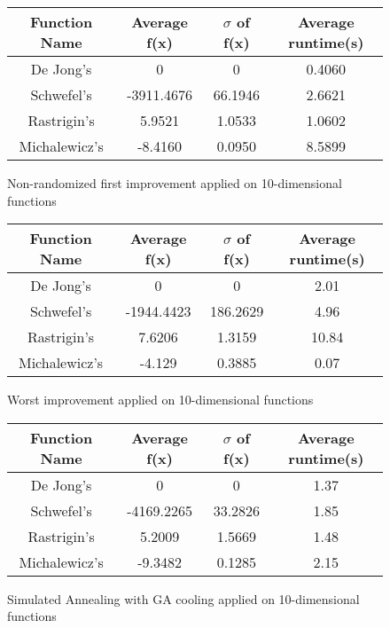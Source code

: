 \documentclass{article}
\begin{document}
\begin{figure}[H]
    \begin{tabular}{|c||c|c|c|} \hline
        Function Name & Average f(x) & $\sigma$ of f(x) & Average runtime(s) \\ \hline \hline
        De Jong's & 0 & 0 & 0.4060 \\ \hline
        Schwefel's & -3911.4676 & 66.1946 & 2.6621 \\ \hline
        Rastrigin's & 5.9521 & 1.0533 & 1.0602 \\ \hline
        Michalewicz's & -8.4160 & 0.0950 & 8.5899 \\ \hline
    \end{tabular}
    \caption{Non-randomized first improvement applied on 10-dimensional functions}
    \end{figure}

\begin{figure}[H]
\begin{tabular}{|c||c|c|c|} \hline
	Function Name & Average f(x) & $\sigma$ of f(x) & Average runtime(s) \\ \hline \hline
	De Jong's & 0 & 0 & 2.01 \\ \hline
	Schwefel's & -1944.4423 & 186.2629 & 4.96 \\ \hline
	Rastrigin's & 7.6206 & 1.3159 & 10.84 \\ \hline
	Michalewicz's & -4.129 & 0.3885 & 0.07 \\ \hline
\end{tabular}
\caption{Worst improvement applied on 10-dimensional functions}
\end{figure}

\begin{figure}[H]
\begin{tabular}{|c||c|c|c|} \hline
	Function Name & Average f(x) & $\sigma$ of f(x) & Average runtime(s) \\ \hline \hline
	De Jong's & 0 & 0 & 1.37 \\ \hline
	Schwefel's & -4169.2265 & 33.2826 & 1.85 \\ \hline
	Rastrigin's & 5.2009 & 1.5669 & 1.48 \\ \hline
	Michalewicz's & -9.3482 & 0.1285 & 2.15 \\ \hline
\end{tabular}
\caption{Simulated Annealing with GA cooling applied on 10-dimensional functions}
\end{figure}
\end{document}
